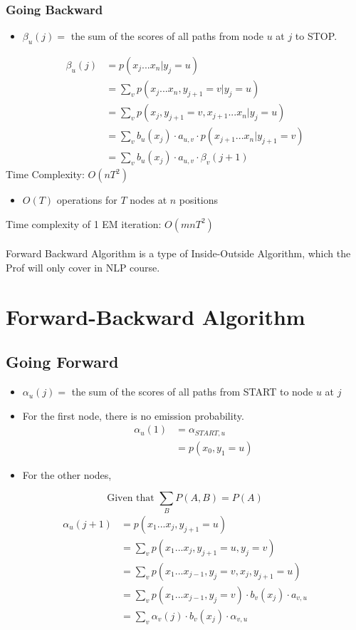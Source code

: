 \documentclass[a4paper]{article}
\begin{document}
\subsubsection{Going Backward}
\begin{itemize}
	\item $\beta_u(j) =$ the sum of the scores of all paths from node $u$ at $j$ to STOP.
\end{itemize}
\begin{align*}
	\beta_u(j) &= p(x_j...x_n | y_j = u)\\
	&= \sum_v p(x_j...x_n, y_{j+1} = v | y_j = u)\\
	&= \sum_v p(x_j, y_{j+1} = v, x_{j+1}... x_n | y_j =u)\\
	&= \sum_v b_u(x_j) \cdot a_{u,v} \cdot p(x_{j+1}...x_n | y_{j+1} = v)\\
	&= \sum_v b_u(x_j) \cdot a_{u,v} \cdot \beta_v(j+1)
\end{align*}
Time Complexity: $O(nT^2)$
\begin{itemize}
	\item $O(T)$ operations for $T$ nodes at $n$ positions
\end{itemize}
Time complexity of 1 EM iteration: $O(mnT^2)$\\
\\
\noindent Forward Backward Algorithm is a type of Inside-Outside Algorithm, which the Prof will only cover in NLP course.

\section{Forward-Backward Algorithm}
\subsection{Going Forward}
\begin{itemize}
	\item $\alpha_u(j) =$ the sum of the scores of all paths from START to node $u$ at $j$
	\item For the first node, there is no emission probability. 
	\begin{align*}
		\alpha_u(1) &= \alpha_{START,u}\\
		&= p(x_0 , y_1 = u)
	\end{align*}
	\item For the other nodes,
\end{itemize}
$$\text{Given that }\sum_B P(A,B) = P(A)$$
\begin{align*}
	\alpha_u(j+1) &= p(x_1 ... x_j, y_{j+1} = u)\\
	&= \sum_v p(x_1...x_j, y_{j+1} = u, y_j = v)\\
	&= \sum_v p(x_1...x_{j-1}, y_j = v, x_j, y_{j+1}= u)\\
	&= \sum_v p(x_1...x_{j-1}, y_j = v) \cdot b_v(x_j) \cdot a_{v,u}\\
	&= \sum_v \alpha_v(j) \cdot b_v(x_j)\cdot \alpha_{v,u}
\end{align*}
\newpage
\end{document}
